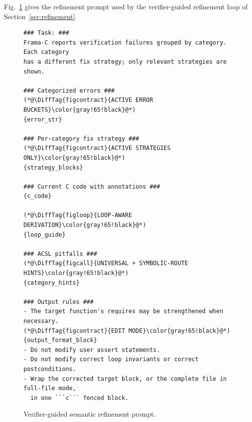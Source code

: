 \label{app:prompt-refine}

\DIFaddbegin
Fig.~\ref{fig:prompt-refine} gives the refinement prompt used by the verifier-guided refinement loop of Section~\ref{sec:refinement}.
\DIFaddend

\begin{figure}[!htbp]
\centering
\begin{tcolorbox}[promptboxcompact, title={Verifier-guided refinement prompt}, width=\columnwidth]
\begin{lstlisting}[style=PromptInnerCompact]
### Task: ###
Frama-C reports verification failures grouped by category. Each category
has a different fix strategy; only relevant strategies are shown.

### Categorized errors ###
(*@\DiffTag{figcontract}{ACTIVE ERROR BUCKETS}\color{gray!65!black}@*)
{error_str}

### Per-category fix strategy ###
(*@\DiffTag{figcontract}{ACTIVE STRATEGIES ONLY}\color{gray!65!black}@*)
{strategy_blocks}

### Current C code with annotations ###
{c_code}

(*@\DiffTag{figloop}{LOOP-AWARE DERIVATION}\color{gray!65!black}@*)
{loop_guide}

### ACSL pitfalls ###
(*@\DiffTag{figcall}{UNIVERSAL + SYMBOLIC-ROUTE HINTS}\color{gray!65!black}@*)
{category_hints}

### Output rules ###
- The target function's requires may be strengthened when necessary.
(*@\DiffTag{figcontract}{EDIT MODE}\color{gray!65!black}@*)
{output_format_block}
- Do not modify user assert statements.
- Do not modify correct loop invariants or correct postconditions.
- Wrap the corrected target block, or the complete file in full-file mode,
  in one ```c``` fenced block.
\end{lstlisting}
\end{tcolorbox}
\caption{Verifier-guided semantic refinement prompt.}
\label{fig:prompt-refine}
\end{figure}
